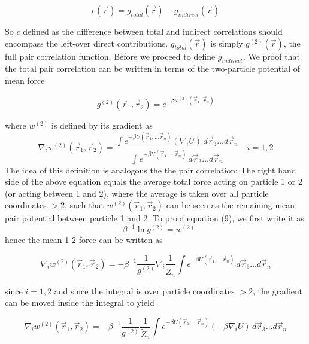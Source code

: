 \documentclass[11pt,a4paper]{article}
\begin{document}
\begin{equation}
c(\vec r) = g_{total}(\vec r) - g_{indirect} (\vec r)
\end{equation}

So $c$ defined as the difference between total and indirect correlations should encompass the left-over direct contributions. $g_{total}(\vec r)$ is simply
$g^{(2)}(\vec r)$, the full pair correlation function. Before we proceed to define $g_{indirect}$. We proof that the total pair correlation can be written
in terms of the two-particle potential of mean force

\begin{equation}
g^{(2)}(\vec r_1, \vec r_2) = e^{- \beta w^{(2)} (\vec r_1, \vec r_2)  }
\end{equation}

where $w^{(2)}$ is defined by its gradient as
\begin{equation}
\nabla_i w^{(2)}(\vec r_1, \vec r_2) = 
\frac{ \int e^{-\beta U(\vec r_1, \dots \vec r_n)} (\nabla_i U) \, d\vec r_3 \dots d\vec r_n } 
     { \int e^{-\beta U(\vec r_1, \dots \vec r_n)}              \, d\vec r_3 \dots d\vec r_n }
\quad i = 1,2
\end{equation}
The idea of this definition is analogous the the pair correlation: The right hand side of the above equation equals the average
total force acting on particle 1 or 2 (or acting between 1 and 2), where the average is taken over all particle coordinates $>2$,
such that $w^{(2)}(\vec r_1, \vec r_2)$ can be seen as the remaining mean pair potential between particle 1 and 2.\newline
To proof equation (9), we first write it as
\begin{equation}
- \beta^{-1} \ln g^{(2)} = w^{(2)}
\end{equation}
hence the mean 1-2 force can be written as

\begin{equation}
\nabla_i w^{(2)}(\vec r_1, \vec r_2) =
- \beta^{-1} \frac{1}{g^{(2)} } \nabla_i \frac{1}{\tilde Z_n} \int e^{-\beta U(\vec r_1, \dots \vec r_n)}\, d\vec r_3 \dots d\vec r_n
\end{equation}

since $i=1,2$ and since the integral is over particle coordinates $>2$, the gradient can be moved inside the integral to yield

\begin{equation}
\nabla_i w^{(2)}(\vec r_1, \vec r_2) =
- \beta^{-1} \frac{1}{g^{(2)} } \frac{1}{\tilde Z_n} \int e^{-\beta U(\vec r_1, \dots \vec r_n)} (-\beta \nabla_i U) \, d\vec r_3 \dots d\vec r_n
\end{equation}
\end{document}
